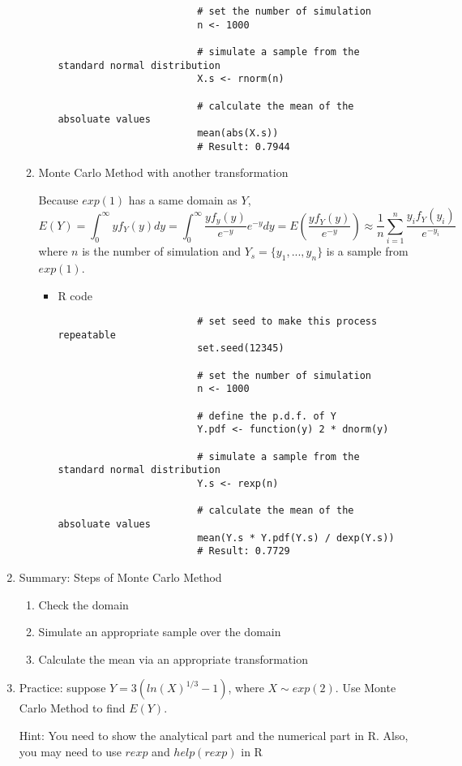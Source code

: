 \begin{enumerate}
\begin{enumerate}
\begin{itemize}
\begin{verbatim}
						# set the number of simulation
						n <- 1000
						
						# simulate a sample from the standard normal distribution
						X.s <- rnorm(n)
						
						# calculate the mean of the absoluate values
						mean(abs(X.s))
						# Result: 0.7944
					\end{verbatim}
				\end{itemize}
			\item Monte Carlo Method with another transformation
				\par Because $exp(1)$ has a same domain as $Y$, 
				\begin{equation*}
					E(Y) = \int_{0}^{\infty}yf_Y(y)dy = \int_{0}^{\infty}\frac{yf_y(y)}{e^{-y}}e^{-y}dy = E(\frac{yf_Y(y)}{e^{-y}}) \approx \frac{1}{n}\sum_{i=1}^{n}\frac{y_if_Y(y_i)}{e^{-y_i}}
				\end{equation*}
				where $n$ is the number of simulation and $Y_s = \{y_1, ..., y_n\}$ is a sample from $exp(1)$.
				\begin{itemize}
					\item R code
					\begin{verbatim}
						# set seed to make this process repeatable
						set.seed(12345)
						
						# set the number of simulation
						n <- 1000
						
						# define the p.d.f. of Y
						Y.pdf <- function(y) 2 * dnorm(y)
						
						# simulate a sample from the standard normal distribution
						Y.s <- rexp(n)
						
						# calculate the mean of the absoluate values
						mean(Y.s * Y.pdf(Y.s) / dexp(Y.s))
						# Result: 0.7729
					\end{verbatim}
				\end{itemize}
		\end{enumerate}
	\item Summary: Steps of Monte Carlo Method
		\begin{enumerate}
			\item Check the domain
			\item Simulate an appropriate sample over the domain 
			\item Calculate the mean via an appropriate transformation
		\end{enumerate}
	\item Practice: suppose $Y = 3(ln(X)^{1/3} - 1)$, where $X \sim exp(2)$. Use Monte Carlo Method to find $E(Y)$.
	\par Hint: You need to show the analytical part and the numerical part in R. Also, you may need to use $rexp$ and $help(rexp)$ in R
\end{enumerate}